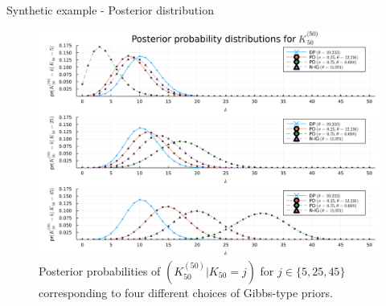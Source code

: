 \documentclass[11pt]{beamer}
\begin{document}
\begin{frame}{Synthetic example - Posterior distribution} 
    \begin{figure}
        \includegraphics[scale=0.1]{../img/posterior_probability.png}
        \caption{Posterior probabilities of \((K^{(50)}_{50} | K_{50} = j)\) for \(j \in \{5, 25, 45\}\) corresponding to four different choices of Gibbs-type priors.}
        \label{fig:posterior}
    \end{figure}
\end{frame}
\end{document}
